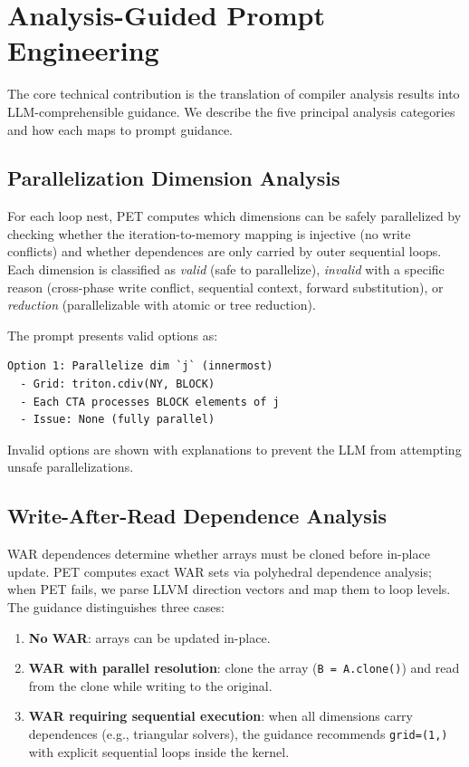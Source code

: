 \documentclass[sigconf]{acmart}
\newcommand{\pet}{PET\xspace}
\begin{document}
\section{Analysis-Guided Prompt Engineering}
\label{sec:analysis}

The core technical contribution is the translation of compiler analysis
results into LLM-comprehensible guidance.  We describe the five
principal analysis categories and how each maps to prompt guidance.

\subsection{Parallelization Dimension Analysis}

For each loop nest, \pet{} computes which dimensions can be safely
parallelized by checking whether the iteration-to-memory mapping is
injective (no write conflicts) and whether dependences are only carried
by outer sequential loops.  Each dimension is classified as
\emph{valid} (safe to parallelize), \emph{invalid} with a specific
reason (cross-phase write conflict, sequential context, forward
substitution), or \emph{reduction} (parallelizable with atomic or
tree reduction).

The prompt presents valid options as:
\begin{lstlisting}[language={},frame=none,numbers=none,xleftmargin=0em]
Option 1: Parallelize dim `j` (innermost)
  - Grid: triton.cdiv(NY, BLOCK)
  - Each CTA processes BLOCK elements of j
  - Issue: None (fully parallel)
\end{lstlisting}
Invalid options are shown with explanations to prevent the LLM from
attempting unsafe parallelizations.

\subsection{Write-After-Read Dependence Analysis}

WAR dependences determine whether arrays must be cloned before in-place
update.  \pet{} computes exact WAR sets via polyhedral dependence
analysis; when \pet{} fails, we parse LLVM direction vectors and map
them to loop levels.  The guidance distinguishes three cases:

\begin{enumerate}
  \item \textbf{No WAR}: arrays can be updated in-place.
  \item \textbf{WAR with parallel resolution}: clone the array
    (\texttt{B = A.clone()}) and read from the clone while writing to
    the original.
  \item \textbf{WAR requiring sequential execution}: when all
    dimensions carry dependences (e.g., triangular solvers), the
    guidance recommends \texttt{grid=(1,)} with explicit sequential
    loops inside the kernel.
\end{enumerate}
\end{document}
